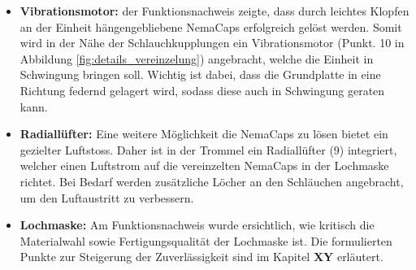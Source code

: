 \begin{itemize}
	\item \textbf{Vibrationsmotor:} der Funktionsnachweis zeigte, dass durch leichtes Klopfen an der Einheit hängengebliebene NemaCaps erfolgreich gelöst werden. Somit wird in der Nähe der Schlauchkupplungen ein Vibrationsmotor (Punkt. 10 in Abbildung \ref{fig:details_vereinzelung}) angebracht, welche die Einheit in Schwingung bringen soll. Wichtig ist dabei, dass die Grundplatte in eine Richtung federnd gelagert wird, sodass diese auch in Schwingung geraten kann.
	
	\item \textbf{Radiallüfter:} Eine weitere Möglichkeit die NemaCaps zu lösen bietet ein gezielter Luftstoss. Daher ist in der Trommel ein Radiallüfter (9) integriert, welcher einen Luftstrom auf die vereinzelten NemaCaps in der Lochmaske richtet. Bei Bedarf werden zusätzliche Löcher an den Schläuchen angebracht, um den Luftaustritt zu verbessern. 
	
	\item \textbf{Lochmaske:} Am Funktionsnachweis wurde ersichtlich, wie kritisch die Materialwahl sowie Fertigungsqualität der Lochmaske ist. Die formulierten Punkte zur Steigerung der Zuverlässigkeit sind im Kapitel \textbf{XY} erläutert.
\end{itemize}


